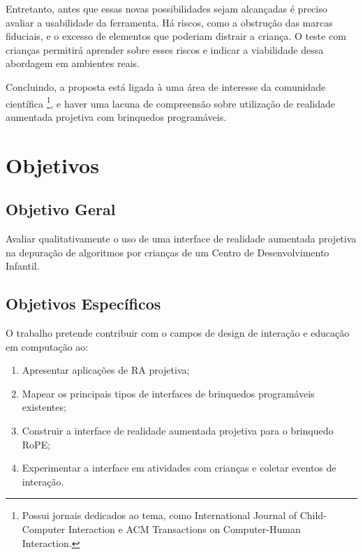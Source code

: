 Entretanto, antes que essas novas possibilidades sejam alcançadas é preciso avaliar a usabilidade da ferramenta. Há riscos, como a obstrução das marcas fiduciais, e o excesso de elementos que poderiam distrair a criança. O teste com crianças permitirá aprender sobre esses riscos e indicar a viabilidade dessa abordagem em ambientes reais.

Concluindo, a proposta está ligada à uma área de interesse da comunidade científica \footnote{Possui jornais dedicados ao tema, como International Journal of Child-Computer Interaction e ACM Transactions on Computer-Human Interaction.}, e haver uma lacuna de compreensão sobre utilização de realidade aumentada projetiva com brinquedos programáveis.

\section{Objetivos}
\label{s_cintro_objetivos}

\subsection{Objetivo Geral}
\label{ss_cintro_objetivo_geral}

Avaliar qualitativamente o uso de uma interface de realidade aumentada projetiva na depuração de algoritmos por crianças de um Centro de Desenvolvimento Infantil.

\subsection{Objetivos Específicos}
\label{ss_cintro_objetivos_espec}

O trabalho pretende contribuir com o campos de design de interação e educação em computação ao:

\begin{enumerate}
    
    \item Apresentar aplicações de RA projetiva;

    \item\label{obj_mapear} Mapear os principais tipos de interfaces de brinquedos programáveis existentes;
    
    \item\label{obj_interface} Construir a interface de realidade aumentada projetiva para o brinquedo RoPE;
    
    \item\label{obj_avaliar} Experimentar a interface em atividades com crianças e coletar eventos de interação.
    
\end{enumerate}
